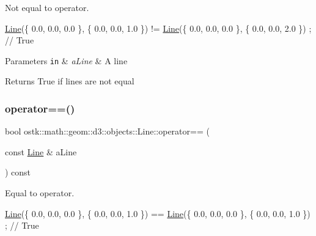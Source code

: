 Not equal to operator. 


\begin{DoxyCode}
\hyperlink{classostk_1_1math_1_1geom_1_1d3_1_1objects_1_1_line_a9ebdaaf67a4bd91780808f8683463ebe}{Line}(\{ 0.0, 0.0, 0.0 \}, \{ 0.0, 0.0, 1.0 \}) != \hyperlink{classostk_1_1math_1_1geom_1_1d3_1_1objects_1_1_line_a9ebdaaf67a4bd91780808f8683463ebe}{Line}(\{ 0.0, 0.0, 0.0 \}, \{ 0.0, 0.0, 2.0 \}) ; \textcolor{comment}{// True}
\end{DoxyCode}



\begin{DoxyParams}[1]{Parameters}
\mbox{\tt in}  & {\em a\+Line} & A line \\
\hline
\end{DoxyParams}
\begin{DoxyReturn}{Returns}
True if lines are not equal 
\end{DoxyReturn}
\mbox{\label{classostk_1_1math_1_1geom_1_1d3_1_1objects_1_1_line_a60d23a12b6f81685f430c0fd8ff07752}} 
\subsubsection{\texorpdfstring{operator==()}{operator==()}}
{\footnotesize\ttfamily bool ostk\+::math\+::geom\+::d3\+::objects\+::\+Line\+::operator== (\begin{DoxyParamCaption}\item[{const \hyperlink{classostk_1_1math_1_1geom_1_1d3_1_1objects_1_1_line}{Line} \&}]{a\+Line }\end{DoxyParamCaption}) const}



Equal to operator. 


\begin{DoxyCode}
\hyperlink{classostk_1_1math_1_1geom_1_1d3_1_1objects_1_1_line_a9ebdaaf67a4bd91780808f8683463ebe}{Line}(\{ 0.0, 0.0, 0.0 \}, \{ 0.0, 0.0, 1.0 \}) == \hyperlink{classostk_1_1math_1_1geom_1_1d3_1_1objects_1_1_line_a9ebdaaf67a4bd91780808f8683463ebe}{Line}(\{ 0.0, 0.0, 0.0 \}, \{ 0.0, 0.0, 1.0 \}) ; \textcolor{comment}{// True}
\end{DoxyCode}



